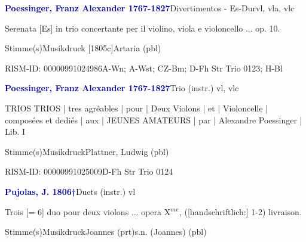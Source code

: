 \documentclass[twocolumn]{book}
\begin{document}
\par \vspace{7pt} \textcolor{darkblue}{\textbf{Poessinger, Franz Alexander  1767-1827}}\hfillplus{\textbf{[315]}}\newline Divertimentos - Es-Dur\newline vl, vla, vlc
\par \begin{itshape}Serenata [Es] in trio concertante per il violino, viola e violoncello ... op. 10.\end{itshape} 
\par \textcolor{darkblue}{}  Stimme(s)\newline Musikdruck  [1805c]\newline Artaria  (pbl)
\par RISM-ID: 00000991024986\newline A-Wn; A-Wst; CZ-Bm; D-Fh  Str Trio 0123; H-Bl
\par \vspace{7pt} \textcolor{darkblue}{\textbf{Poessinger, Franz Alexander  1767-1827}}\hfillplus{\textbf{[316]}}\newline Trio (instr.) vl, vlc
\par \begin{itshape}TRIOS TRIOS | tres agréables | pour | Deux Violons | et | Violoncelle | composées et dediés | aux | JEUNES AMATEURS | par | Alexandre Poessinger | Lib. I\end{itshape} 
\par \textcolor{darkblue}{}  Stimme(s)\newline Musikdruck\newline Plattner, Ludwig  (pbl)
\par RISM-ID: 00000991025009\newline D-Fh  Str Trio 0124
\par \vspace{7pt} \textcolor{darkblue}{\textbf{Pujolas, J.  1806†}}\hfillplus{\textbf{[317]}}\newline Duets (instr.) vl
\par \begin{itshape}Trois [= 6] duo pour deux violons ... opera X$^m$$^e$, ([handschriftlich:] 1-2) livraison.\end{itshape} 
\par \textcolor{darkblue}{}  Stimme(s)\newline Musikdruck\newline Joannes  (prt)\newline s.n. (Joannes)  (pbl)
\end{document}
